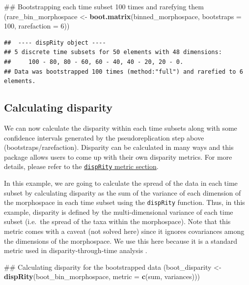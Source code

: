 \documentclass[]{book}
\newenvironment{Shaded}{\begin{snugshade}}{\end{snugshade}}
\newcommand{\KeywordTok}[1]{\textcolor[rgb]{0.13,0.29,0.53}{\textbf{#1}}}
\newcommand{\DataTypeTok}[1]{\textcolor[rgb]{0.13,0.29,0.53}{#1}}
\newcommand{\DecValTok}[1]{\textcolor[rgb]{0.00,0.00,0.81}{#1}}
\newcommand{\StringTok}[1]{\textcolor[rgb]{0.31,0.60,0.02}{#1}}
\newcommand{\NormalTok}[1]{#1}
\theoremstyle{definition}
\theoremstyle{definition}
\theoremstyle{remark}
\begin{document}
\begin{Shaded}
\begin{Highlighting}[]
\NormalTok{## Bootstrapping each time subset 100 times and rarefying them }
\NormalTok{(rare_bin_morphospace <-}\StringTok{ }\KeywordTok{boot.matrix}\NormalTok{(binned_morphospace, }\DataTypeTok{bootstraps =} \DecValTok{100}\NormalTok{,}
    \DataTypeTok{rarefaction =} \DecValTok{6}\NormalTok{))}
\end{Highlighting}
\end{Shaded}

\begin{verbatim}
##  ---- dispRity object ---- 
## 5 discrete time subsets for 50 elements with 48 dimensions:
##     100 - 80, 80 - 60, 60 - 40, 40 - 20, 20 - 0.
## Data was bootstrapped 100 times (method:"full") and rarefied to 6 elements.
\end{verbatim}

\subsection{Calculating disparity}\label{calculating-disparity}

We can now calculate the disparity within each time subsets along with
some confidence intervals generated by the pseudoreplication step above
(bootstraps/rarefaction). Disparity can be calculated in many ways and
this package allows users to come up with their own disparity metrics.
For more details, please refer to the
\protect\hyperlink{disparity-metrics}{\texttt{dispRity} metric section}.

In this example, we are going to calculate the spread of the data in
each time subset by calculating disparity as the sum of the variance of
each dimension of the morphospace in each time subset using the
\texttt{dispRity} function. Thus, in this example, disparity is defined
by the multi-dimensional variance of each time subset (i.e.~the spread
of the taxa within the morphospace). Note that this metric comes with a
caveat (not solved here) since it ignores covariances among the
dimensions of the morphospace. We use this here because it is a standard
metric used in disparity-through-time analysis \citep{Wills1994}.

\begin{Shaded}
\begin{Highlighting}[]
\NormalTok{## Calculating disparity for the bootstrapped data}
\NormalTok{(boot_disparity <-}\StringTok{ }\KeywordTok{dispRity}\NormalTok{(boot_bin_morphospace, }\DataTypeTok{metric =} \KeywordTok{c}\NormalTok{(sum, variances)))}
\end{Highlighting}
\end{Shaded}
\end{document}

